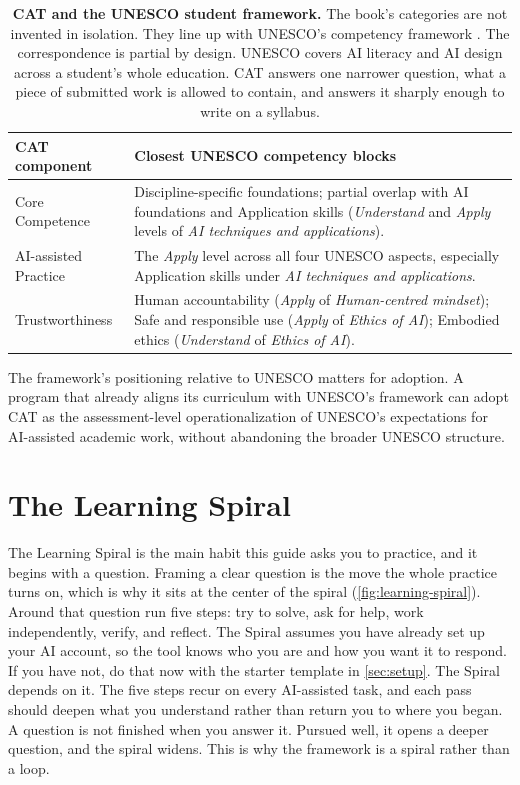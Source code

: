 \documentclass{SIAMbook2023}
\begin{document}
\begin{table}[ht]
\centering
\caption{\textbf{CAT and the UNESCO student framework.} The book's categories are not invented in isolation. They line up with UNESCO's competency framework \citep{miao2024aia}. The correspondence is partial by design. UNESCO covers AI literacy and AI design across a student's whole education. CAT answers one narrower question, what a piece of submitted work is allowed to contain, and answers it sharply enough to write on a syllabus.}
\label{tab:cat-unesco}
\begin{tabularx}{\textwidth}{>{\raggedright\arraybackslash}X >{\raggedright\arraybackslash}X}
\toprule
\textbf{CAT component} & \textbf{Closest UNESCO competency blocks} \\
\midrule
Core Competence & Discipline-specific foundations; partial overlap with AI foundations and Application skills (\emph{Understand} and \emph{Apply} levels of \emph{AI techniques and applications}). \\
\addlinespace
AI-assisted Practice & The \emph{Apply} level across all four UNESCO aspects, especially Application skills under \emph{AI techniques and applications}. \\
\addlinespace
Trustworthiness & Human accountability (\emph{Apply} of \emph{Human-centred mindset}); Safe and responsible use (\emph{Apply} of \emph{Ethics of AI}); Embodied ethics (\emph{Understand} of \emph{Ethics of AI}). \\
\bottomrule
\end{tabularx}
\end{table}

The framework's positioning relative to UNESCO matters for adoption. A program that already aligns its curriculum with UNESCO's framework can adopt CAT as the assessment-level operationalization of UNESCO's expectations for AI-assisted academic work, without abandoning the broader UNESCO structure.

\section{The Learning Spiral}
\label{sec:learning-spiral}%

The Learning Spiral is the main habit this guide asks you to practice, and it begins with a question. Framing a clear question is the move the whole practice turns on, which is why it sits at the center of the spiral (\cref{fig:learning-spiral}). Around that question run five steps: try to solve, ask for help, work independently, verify, and reflect. The Spiral assumes you have already set up your AI account, so the tool knows who you are and how you want it to respond. If you have not, do that now with the starter template in \cref{sec:setup}. The Spiral depends on it. The five steps recur on every AI-assisted task, and each pass should deepen what you understand rather than return you to where you began. A question is not finished when you answer it. Pursued well, it opens a deeper question, and the spiral widens. This is why the framework is a spiral rather than a loop.
\end{document}
